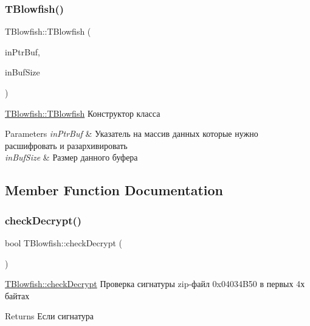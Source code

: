 \subsubsection{\texorpdfstring{T\+Blowfish()}{TBlowfish()}}
{\footnotesize\ttfamily T\+Blowfish\+::\+T\+Blowfish (\begin{DoxyParamCaption}\item[{td\+Ptr\+Buf}]{in\+Ptr\+Buf,  }\item[{quint32}]{in\+Buf\+Size }\end{DoxyParamCaption})}



\hyperlink{classunit_test_1_1_t_blowfish_a349e59d7c45d5675376b89def7500c16}{T\+Blowfish\+::\+T\+Blowfish} Конструктор класса 


\begin{DoxyParams}{Parameters}
{\em in\+Ptr\+Buf} & Указатель на массив данных которые нужно расшифровать и разархивировать \\
\hline
{\em in\+Buf\+Size} & Размер данного буфера \\
\hline
\end{DoxyParams}


\subsection{Member Function Documentation}
\mbox{\label{classunit_test_1_1_t_blowfish_a53eba59c588fafe24260a0cf05b7866b}} 
\subsubsection{\texorpdfstring{check\+Decrypt()}{checkDecrypt()}}
{\footnotesize\ttfamily bool T\+Blowfish\+::check\+Decrypt (\begin{DoxyParamCaption}{ }\end{DoxyParamCaption})}



\hyperlink{classunit_test_1_1_t_blowfish_a53eba59c588fafe24260a0cf05b7866b}{T\+Blowfish\+::check\+Decrypt} Проверка сигнатуры zip-\/файл 0x04034\+B50 в первых 4х байтах 

\begin{DoxyReturn}{Returns}
Если сигнатура 
\end{DoxyReturn}
\mbox{\label{classunit_test_1_1_t_blowfish_aa6cf535926e4a3daae058725a6192619}} 
